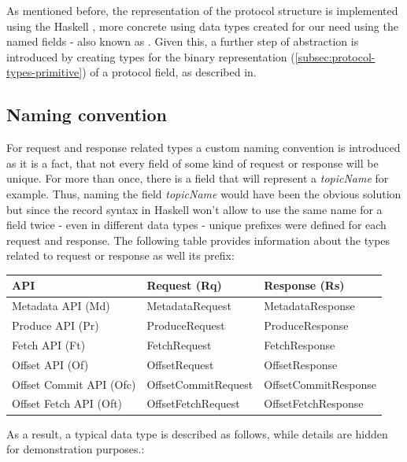 As mentioned before, the representation of the protocol structure is implemented
using the Haskell , more
concrete using data types created for our need using the named fields - also
known as . Given this, a
further step of abstraction is introduced by creating types for the binary
representation (\ref{subsec:protocol-types-primitive}) of a protocol field, as
described in.

\subsection{Naming convention}

For request and response related types a custom naming convention is introduced
as it is a fact, that not every field of some kind of request or response will
be unique. For more than once, there is a field that will represent a
\textit{topicName} for example. Thus, naming the field \textit{topicName} would
have been the obvious solution but since the record syntax in Haskell won't
allow to use the same name for a field twice - even in different data types -
unique prefixes were defined for each request and response. The following table
provides information about the types related to request or response as well its
prefix:

\begin{table}[H]
\centering
\begin{tabular}{|l|l|l|}
\hline
\textbf{API}            & \textbf{Request (Rq)} & \textbf{Response (Rs)} \\ \hline
Metadata API (Md)       & MetadataRequest       & MetadataResponse       \\ \hline
Produce API (Pr)        & ProduceRequest        & ProduceResponse        \\ \hline
Fetch API (Ft)          & FetchRequest          & FetchResponse          \\ \hline
Offset API (Of)         & OffsetRequest         & OffsetResponse         \\ \hline
Offset Commit API (Ofc) & OffsetCommitRequest   & OffsetCommitResponse   \\ \hline
Offset Fetch API (Oft)  & OffsetFetchRequest    & OffsetFetchResponse    \\ \hline
\end{tabular}
\end{table}

As a result, a typical data type is described as follows, while details are
hidden for demonstration purposes.:


